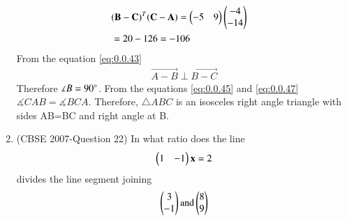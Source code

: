 \documentclass[journal,12pt,twocolumn]{IEEEtran}
\begin{document}
\begin{enumerate}
\begin{align}
 &\mathbf{(B-C)}^T\mathbf{(C-A)} = \begin{pmatrix}-5&9\end{pmatrix}\begin{pmatrix}-4\\-14\end{pmatrix}&\\& = 20-126 = -106 \label{eq:0.0.47}&
\end{align}
From the equation \eqref{eq:0.0.43} \begin{align} \vec{A-B} \perp \vec{B-C}\end{align} Therefore $\measuredangle{B} = 90\degree$.
From the equations \eqref{eq:0.0.45} and \eqref{eq:0.0.47} $\measuredangle{CAB}=\measuredangle{BCA}$.
Therefore, $\triangle{ABC}$ is an isosceles right angle triangle with sides AB=BC and right angle at B.
\bigskip
\item (CBSE 2007-Question 22) In what ratio does the line \begin{align} \begin{pmatrix}1&-1\end{pmatrix}\mathbf{x}=2 \label{eq:0.0.49}\end{align} divides the line segment joining \begin{align}\begin{pmatrix}3 \\-1\end{pmatrix} \text{and} \begin{pmatrix}8\\9\end{pmatrix} \label{eq:0.0.50}\end{align}


\end{enumerate}
\end{document}
